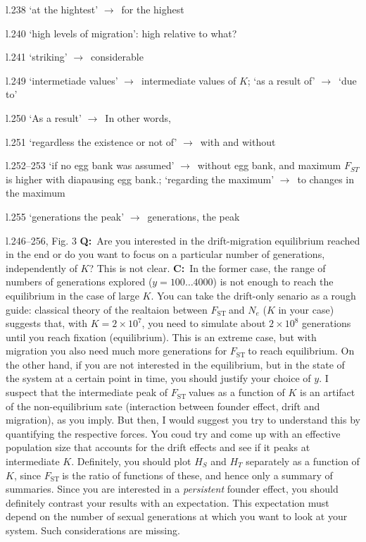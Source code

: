 \documentclass[11pt]{article}
\newenvironment{my_description}
{\begin{description}
  \setlength{\itemsep}{2pt}
  \setlength{\parskip}{0pt}
  \setlength{\parsep}{0pt}}
{\end{description}}
\newcommand{\ra}{$\rightarrow$\ }
\newcommand{\C}{\textbf{C:}\ }
\newcommand{\Q}{\textbf{Q:}\ }
\newcommand{\fst}{$F_{\mathrm{ST}}\ $}
\begin{document}
\begin{my_description}
	\item[l.238] `at the hightest' \ra for the highest
	\item[l.240] `high levels of migration': high relative to what?
	\item[l.241] `striking' \ra considerable
	\item[l.249] `intermetiade values' \ra intermediate values of $K$; `as a result of' \ra `due to'
	\item[l.250] `As a result' \ra In other words,
	\item[l.251] `regardless the existence or not of' \ra with and without
	\item[l.252--253] `if no egg bank was assumed' \ra without egg bank, and maximum $F_{ST}$ is higher with diapausing egg bank.; `regarding the maximum' \ra to changes in the maximum
	\item[l.255] `generations the peak' \ra generations, the peak
	\item[l.246--256, Fig. 3] \Q Are you interested in the drift-migration equilibrium reached in the end or do you want to focus on a particular number of generations, independently of $K$? This is not clear. \C In the former case, the range of numbers of generations explored ($y=100\dots4000$) is not enough to reach the equilibrium in the case of large $K$. You can take the drift-only senario as a rough guide: classical theory of the realtaion between \fst and $N_e$ ($K$ in your case) suggests that, with $K=2\times10^7$, you need to simulate about $2\times10^8$ generations until you reach fixation (equilibrium). This is an extreme case, but with migration you also need much more generations for \fst to reach equilibrium. On the other hand, if you are not interested in the equilibrium, but in the state of the system at a certain point in time, you should justify your choice of $y$. I suspect that the intermediate peak of \fst values as a function of $K$ is an artifact of the non-equilibrium sate (interaction between founder effect, drift and migration), as you imply. But then, I would suggest you try to understand this by quantifying the respective forces. You coud try and come up with an effective population size that accounts for the drift effects and see if it peaks at intermediate $K$. Definitely, you should plot $H_{S}$ and $H_{T}$ separately as a function of $K$, since \fst is the ratio of functions of these, and hence only a summary of summaries. Since you are interested in a \emph{persistent} founder effect, you should definitely contrast your results with an expectation. This expectation must depend on the number of sexual generations at which you want to look at your system. Such considerations are missing.

\end{my_description}
\end{document}
